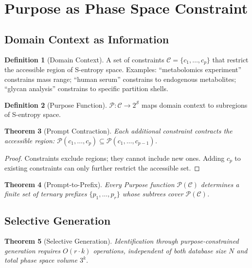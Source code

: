\documentclass[11pt,twocolumn,a4paper]{article}
\newtheorem{theorem}{Theorem}[section]
\theoremstyle{definition}
\newtheorem{definition}[theorem]{Definition}
\theoremstyle{remark}
\newcommand{\Sspace}{\mathcal{S}}
\newcommand{\Purpose}{\mathcal{P}}
\newcommand{\Context}{\mathcal{C}}
\begin{document}
\section{Purpose as Phase Space Constraint}
\label{sec:purpose}

\subsection{Domain Context as Information}

\begin{definition}[Domain Context]
A set of constraints $\Context = \{c_1, \ldots, c_p\}$ that restrict the accessible region of S-entropy space. Examples: ``metabolomics experiment'' constrains mass range; ``human serum'' constrains to endogenous metabolites; ``glycan analysis'' constrains to specific partition shells.
\end{definition}

\begin{definition}[Purpose Function]
$\Purpose: \Context \to 2^\Sspace$ maps domain context to subregions of S-entropy space.
\end{definition}

\begin{theorem}[Prompt Contraction]
\label{thm:contraction}
Each additional constraint contracts the accessible region: $\Purpose(c_1, \ldots, c_p) \subseteq \Purpose(c_1, \ldots, c_{p-1})$.
\end{theorem}

\begin{proof}
Constraints exclude regions; they cannot include new ones. Adding $c_p$ to existing constraints can only further restrict the accessible set.
\end{proof}

\begin{theorem}[Prompt-to-Prefix]
\label{thm:prefix}
Every Purpose function $\Purpose(\Context)$ determines a finite set of ternary prefixes $\{p_1, \ldots, p_r\}$ whose subtrees cover $\Purpose(\Context)$.
\end{theorem}

\subsection{Selective Generation}

\begin{theorem}[Selective Generation]
\label{thm:selective}
Identification through purpose-constrained generation requires $O(r \cdot k)$ operations, independent of both database size $N$ and total phase space volume $3^k$.
\end{theorem}
\end{document}
